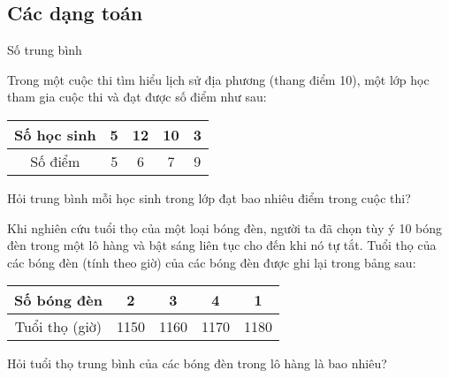 \subsection{Các dạng toán}
\setcounter{subsubsection}{0}
\begin{dang}{Số trung bình}
	
\end{dang}
\begin{vd}%
	Trong một cuộc thi tìm hiểu lịch sử địa phương (thang điểm 10), một lớp học tham gia cuộc thi và đạt được số điểm như sau:
	\begin{center}
		\begin{tabular}{|c|c|c|c|c|}
			\hline
			Số học sinh & 5 & 12 & 10 & 3\\
			\hline
			Số điểm & 5 & 6 & 7 & 9\\
			\hline
		\end{tabular}
	\end{center}
	Hỏi trung bình mỗi học sinh trong lớp đạt bao nhiêu điểm trong cuộc thi?
\end{vd}
\begin{vd}%
	Khi nghiên cứu tuổi thọ của một loại bóng đèn, người ta đã chọn tùy ý 10 bóng đèn trong một lô hàng và bật sáng liên tục cho đến khi nó tự tắt. Tuổi thọ của các bóng đèn (tính theo giờ) của các bóng đèn được ghi lại trong bảng sau:
	\begin{center}
		\begin{tabular}{|c|c|c|c|c|}
			\hline
			Số bóng đèn & 2 & 3 & 4 & 1\\
			\hline
			Tuổi thọ (giờ) & 1150 & 1160 & 1170 & 1180\\
			\hline
		\end{tabular}
	\end{center}
	Hỏi tuổi thọ trung bình của các bóng đèn trong lô hàng là bao nhiêu?
\end{vd}
